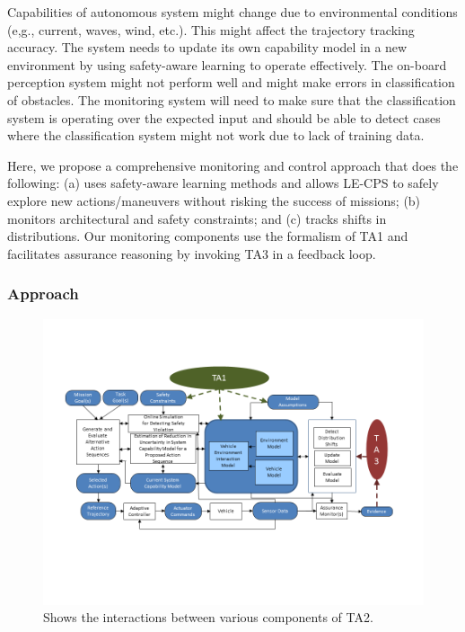 Capabilities of autonomous system might change due to environmental conditions (e,g., current, waves, wind, etc.). This might affect the trajectory tracking accuracy. The system needs to update its own capability model in a new environment by using safety-aware learning to operate effectively. The on-board perception system might not perform well and might make errors in classification of obstacles. The monitoring system will need to make sure that the classification system is operating over the expected input and should be able to detect cases where the classification system might not work due to lack of training data. 
 
Here, we propose a comprehensive monitoring and control approach that does the following: (a) uses safety-aware learning methods and allows LE-CPS to safely explore new actions/maneuvers without risking the success of missions; (b) monitors architectural and safety constraints; and (c) tracks shifts in distributions. Our monitoring components use the formalism of TA1 and facilitates assurance reasoning by invoking TA3 in a feedback loop.

\subsubsection{Approach}

\begin{figure}[t]
\centering
\includegraphics[width=\textwidth,trim=1cm 5cm 0 3cm,clip]{./TA2/sal-v5.png}
\caption{Shows the interactions between various components of TA2.}
\end{figure}

